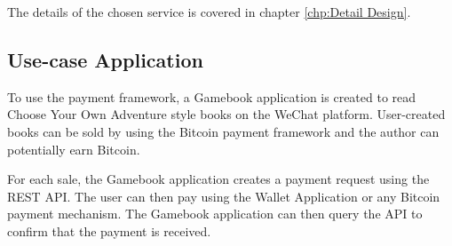 The details of the chosen service is covered in chapter \ref{chp:Detail Design}.

\subsection{Use-case Application}

To use the payment framework, a Gamebook application is created to read Choose Your Own Adventure style books on the WeChat platform. User-created books can be sold by using the Bitcoin payment framework and the author can potentially earn Bitcoin.

For each sale, the Gamebook application creates a payment request using the REST API. The user can then pay using the Wallet Application or any Bitcoin payment mechanism. The Gamebook application can then query the API to confirm that the payment is received. 